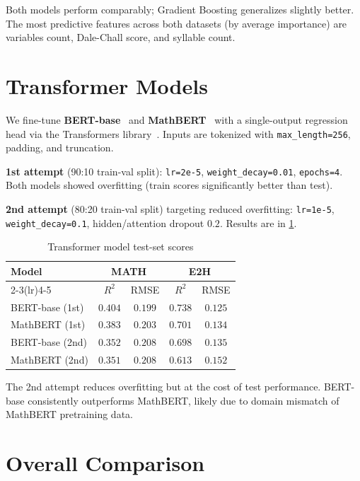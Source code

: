 \documentclass[twocolumn, 10pt]{article}
\begin{document}
Both models perform comparably; Gradient Boosting generalizes slightly better. The most predictive features across both datasets (by average importance) are variables count, Dale-Chall score, and syllable count.

\section{Transformer Models}
\label{sec:bert}

We fine-tune \textbf{BERT-base}~\cite{bertbase} and \textbf{MathBERT}~\cite{mathbert} with a single-output regression head via the Transformers library~\cite{transformers}. Inputs are tokenized with \texttt{max\_length=256}, padding, and truncation.

\textbf{1st attempt} (90:10 train-val split): \texttt{lr=2e-5}, \texttt{weight\_decay=0.01}, \texttt{epochs=4}. Both models showed overfitting (train scores significantly better than test).

\textbf{2nd attempt} (80:20 train-val split) targeting reduced overfitting: \texttt{lr=1e-5}, \texttt{weight\_decay=0.1}, hidden/attention dropout $0.2$. Results are in \cref{tab:bert}.

\begin{table}[ht]
\centering
\caption{Transformer model test-set scores}
\label{tab:bert}
\small
\begin{tabular}{lcccc}
\toprule
\multirow{2}{*}{\textbf{Model}} & \multicolumn{2}{c}{\textbf{MATH}} & \multicolumn{2}{c}{\textbf{E2H}} \\
\cmidrule(lr){2-3}\cmidrule(lr){4-5}
& $R^2$ & RMSE & $R^2$ & RMSE \\
\midrule
BERT-base (1st) & $0.404$ & $0.199$ & $0.738$ & $0.125$ \\
MathBERT (1st)  & $0.383$ & $0.203$ & $0.701$ & $0.134$ \\
BERT-base (2nd) & $0.352$ & $0.208$ & $0.698$ & $0.135$ \\
MathBERT (2nd)  & $0.351$ & $0.208$ & $0.613$ & $0.152$ \\
\bottomrule
\end{tabular}
\end{table}

The 2nd attempt reduces overfitting but at the cost of test performance. BERT-base consistently outperforms MathBERT, likely due to domain mismatch of MathBERT pretraining data.

\section{Overall Comparison}
\label{sec:comparison}
\end{document}
